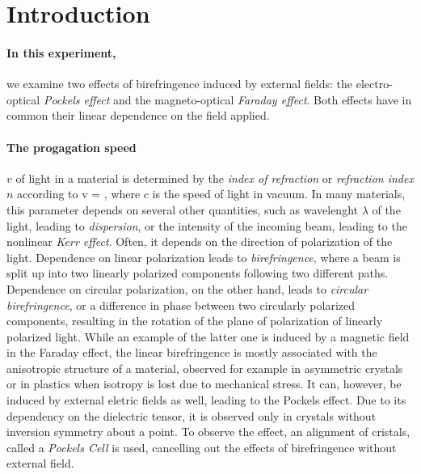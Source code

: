 \section{Introduction}
\paragraph{In this experiment,} we examine two effects of 
birefringence induced by 
external fields: the electro-optical \emph{Pockels effect} and 
the magneto-optical \emph{Faraday effect}. 
Both effects have in common their linear dependence on the 
field applied. 

\paragraph{The progagation speed} $v$ of light in a material is determined 
by the \emph{index of refraction} or 
\emph{refraction index} $n$ according to 
\beqn
   v = , 
\eeqn
where $c$ is the speed of light in vacuum. 
In many materials, this parameter depends on several other quantities, 
such as wavelenght $\lambda$ of the light, leading to \emph{dispersion}, 
or the intensity of the incoming beam, leading to the nonlinear 
\emph{Kerr effect}. Often, it depends on the direction of polarization 
of the light. Dependence on linear polarization leads to \emph{birefringence}, 
where a beam is split up into two linearly polarized 
components following two different paths.  
Dependence on circular polarization, on the other hand, leads to 
\emph{circular birefringence}, 
or a difference in phase between two circularly polarized components, 
resulting in the rotation of the plane of polarization of linearly 
polarized light.
While an example of the latter one is induced by a magnetic field in the 
Faraday effect, 
the linear birefringence is mostly associated with the anisotropic structure 
of a material, observed for example in asymmetric crystals or in plastics 
when isotropy is lost due to mechanical stress. It can, however, be induced 
by external eletric fields as well, leading to the 
Pockels effect. Due to its dependency on the dielectric tensor, it 
is observed only in crystals without inversion symmetry about a point. 
To observe the effect, an alignment of cristals, called a 
\emph{Pockels Cell} is used, cancelling out the effects of birefringence 
without external field. 

